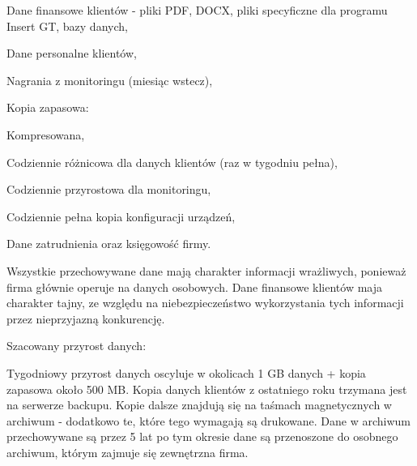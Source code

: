 \hspace{-0.5cm}\begin{minipage}{13.5cm}
	\begin{itemize*}
		\item Dane finansowe klientów - pliki PDF, DOCX, pliki specyficzne dla programu Insert GT, bazy danych,
		\item Dane personalne klientów,
		\item Nagrania z monitoringu (miesiąc wstecz),
		\item Kopia zapasowa:
		\begin{itemize*}
			\item Kompresowana,
			\item Codziennie różnicowa dla danych klientów (raz w tygodniu pełna),
			\item Codziennie przyrostowa dla monitoringu,
			\item Codziennie pełna kopia konfiguracji urządzeń,
		\end{itemize*}
		\item Dane zatrudnienia oraz księgowość firmy.
	\end{itemize*}
\end{minipage}

Wszystkie przechowywane dane mają charakter informacji wrażliwych, ponieważ firma głównie operuje na danych osobowych. Dane finansowe klientów maja charakter tajny, ze względu na niebezpieczeństwo wykorzystania tych informacji przez nieprzyjazną konkurencję.

Szacowany przyrost danych:

Tygodniowy przyrost danych oscyluje w okolicach 1 GB danych + kopia zapasowa około 500 MB. Kopia danych klientów z ostatniego roku trzymana jest na serwerze backupu. Kopie dalsze znajdują się na taśmach magnetycznych w archiwum - dodatkowo te, które tego wymagają są drukowane. Dane w archiwum przechowywane są przez 5 lat po tym okresie dane są przenoszone do osobnego archiwum, którym zajmuje się zewnętrzna firma.
